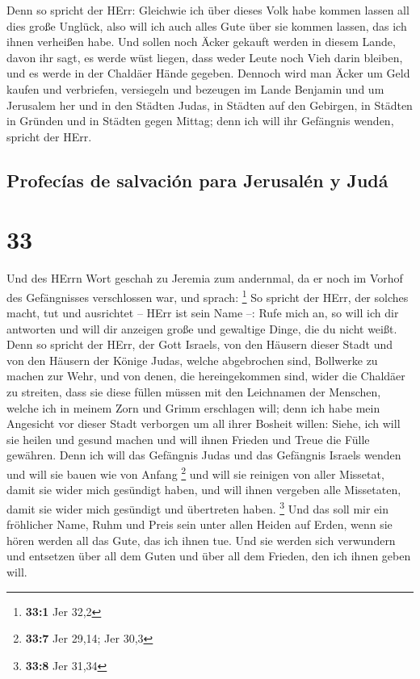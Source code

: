  Denn so spricht der HErr: Gleichwie ich über dieses Volk
habe kommen lassen all dies große Unglück, also will ich auch alles Gute
über sie kommen lassen, das ich ihnen verheißen habe. 
Und sollen noch Äcker gekauft werden in diesem Lande, davon ihr sagt, es
werde wüst liegen, dass weder Leute noch Vieh darin bleiben, und es
werde in der Chaldäer Hände gegeben.  Dennoch wird man
Äcker um Geld kaufen und verbriefen, versiegeln und bezeugen im Lande
Benjamin und um Jerusalem her und in den Städten Judas, in Städten auf
den Gebirgen, in Städten in Gründen und in Städten gegen Mittag; denn
ich will ihr Gefängnis wenden, spricht der HErr.

\hypertarget{profecuxedas-de-salvaciuxf3n-para-jerusaluxe9n-y-juduxe1}{%
\subsection{Profecías de salvación para Jerusalén y
Judá}\label{profecuxedas-de-salvaciuxf3n-para-jerusaluxe9n-y-juduxe1}}

\hypertarget{section-32}{%
\section{33}\label{section-32}}

 Und des HErrn Wort geschah zu Jeremia zum andernmal, da
er noch im Vorhof des Gefängnisses verschlossen war, und sprach:
\footnote{\textbf{33:1} Jer 32,2}  So spricht der HErr,
der solches macht, tut und ausrichtet -- HErr ist sein Name --:
 Rufe mich an, so will ich dir antworten und will dir
anzeigen große und gewaltige Dinge, die du nicht weißt. 
Denn so spricht der HErr, der Gott Israels, von den Häusern dieser Stadt
und von den Häusern der Könige Judas, welche abgebrochen sind, Bollwerke
zu machen zur Wehr,  und von denen, die hereingekommen
sind, wider die Chaldäer zu streiten, dass sie diese füllen müssen mit
den Leichnamen der Menschen, welche ich in meinem Zorn und Grimm
erschlagen will; denn ich habe mein Angesicht vor dieser Stadt verborgen
um all ihrer Bosheit willen:  Siehe, ich will sie heilen
und gesund machen und will ihnen Frieden und Treue die Fülle gewähren.
 Denn ich will das Gefängnis Judas und das Gefängnis
Israels wenden und will sie bauen wie von Anfang \footnote{\textbf{33:7}
  Jer 29,14; Jer 30,3}  und will sie reinigen von aller
Missetat, damit sie wider mich gesündigt haben, und will ihnen vergeben
alle Missetaten, damit sie wider mich gesündigt und übertreten haben.
\footnote{\textbf{33:8} Jer 31,34}  Und das soll mir ein
fröhlicher Name, Ruhm und Preis sein unter allen Heiden auf Erden, wenn
sie hören werden all das Gute, das ich ihnen tue. Und sie werden sich
verwundern und entsetzen über all dem Guten und über all dem Frieden,
den ich ihnen geben will.

